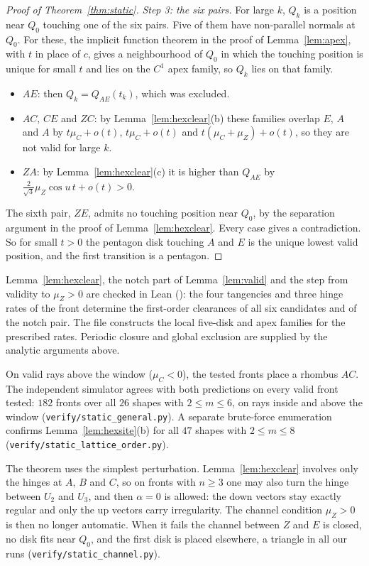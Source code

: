 \begin{proof}[Proof of Theorem~\ref{thm:static}]
\smallskip\noindent\emph{Step 3: the six pairs.} For large $k$, $Q_k$ is a position near $Q_0$ touching one
of the six pairs. Five of them have non-parallel normals at $Q_0$. For these, the implicit function
theorem in the proof of Lemma~\ref{lem:apex}, with $t$ in place of $c$, gives a neighbourhood of $Q_0$ in
which the touching position is unique for small $t$ and lies on the $C^1$ apex family, so $Q_k$ lies on
that family.
\begin{itemize}
\item $AE$: then $Q_k=Q_{AE}(t_k)$, which was excluded.
\item $AC$, $CE$ and $ZC$: by Lemma~\ref{lem:hexclear}(b) these families overlap $E$, $A$ and $A$ by
$t\mu_C+o(t)$, $t\mu_C+o(t)$ and $t(\mu_C+\mu_Z)+o(t)$, so they are not valid for large $k$.
\item $ZA$: by Lemma~\ref{lem:hexclear}(c) it is higher than $Q_{AE}$ by $\tfrac2{\sqrt3}\mu_Z\cos u\,t+o(t)>0$.
\end{itemize}
The sixth pair, $ZE$, admits no touching position near $Q_0$, by the separation argument in the proof of
Lemma~\ref{lem:hexclear}. Every case gives a contradiction. So for small $t>0$ the pentagon disk
touching $A$ and $E$ is the unique lowest valid position, and the first transition is a pentagon.
\end{proof}

\noindent Lemma~\ref{lem:hexclear}, the notch part of Lemma~\ref{lem:valid} and the step from validity to
$\mu_Z>0$ are checked in Lean (): the four tangencies and three hinge rates of the front
determine the first-order clearances of all six candidates and of the notch pair. The file
 constructs the local five-disk and apex families for the prescribed
rates. Periodic closure and global exclusion are supplied by the analytic arguments above.

On valid rays above the window ($\mu_C<0$), the tested fronts place a rhombus $AC$. The independent
simulator agrees with both predictions on every valid front tested: $182$ fronts over all $26$ shapes with
$2\le m\le6$, on rays inside and above the window (\texttt{verify/static\_general.py}).
A separate brute-force enumeration confirms Lemma~\ref{lem:hexsite}(b) for all $47$ shapes with
$2\le m\le8$ (\texttt{verify/static\_lattice\_order.py}).

The theorem uses the simplest perturbation. Lemma~\ref{lem:hexclear} involves only the hinges at $A$, $B$
and $C$, so on fronts with $n\ge3$ one may also turn the hinge between $U_2$ and $U_3$, and then $\alpha=0$ is
allowed: the down vectors stay exactly regular and only the up vectors carry irregularity. The channel
condition $\mu_Z>0$ is then no longer automatic. When it fails the channel between $Z$ and $E$ is closed, no
disk fits near $Q_0$, and the first disk is placed elsewhere, a triangle in all our runs
(\texttt{verify/static\_channel.py}).
